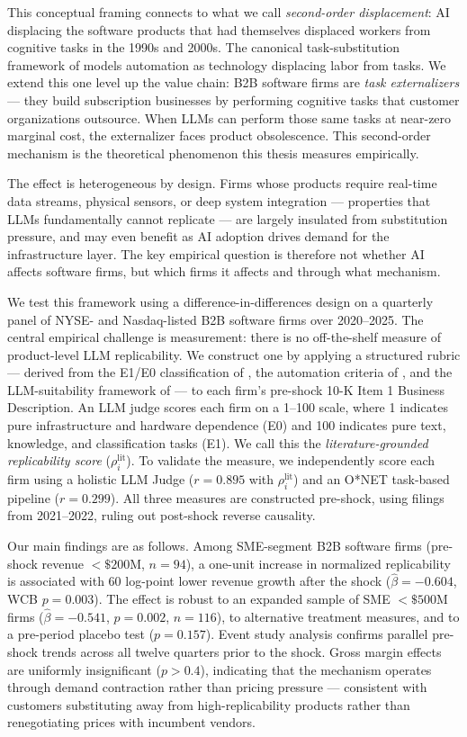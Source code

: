\documentclass[12pt,a4paper]{article}
\begin{document}
This conceptual framing connects to what we call \emph{second-order displacement}: AI displacing the software products that had themselves displaced workers from cognitive tasks in the 1990s and 2000s. The canonical task-substitution framework of \citet{acemoglu2022} models automation as technology displacing labor from tasks. We extend this one level up the value chain: B2B software firms are \emph{task externalizers} --- they build subscription businesses by performing cognitive tasks that customer organizations outsource. When LLMs can perform those same tasks at near-zero marginal cost, the externalizer faces product obsolescence. This second-order mechanism is the theoretical phenomenon this thesis measures empirically.

The effect is heterogeneous by design. Firms whose products require real-time data streams, physical sensors, or deep system integration --- properties that LLMs fundamentally cannot replicate --- are largely insulated from substitution pressure, and may even benefit as AI adoption drives demand for the infrastructure layer. The key empirical question is therefore not whether AI affects software firms, but which firms it affects and through what mechanism.

We test this framework using a difference-in-differences design on a quarterly panel of NYSE- and Nasdaq-listed B2B software firms over 2020--2025. The central empirical challenge is measurement: there is no off-the-shelf measure of product-level LLM replicability. We construct one by applying a structured rubric --- derived from the E1/E0 classification of \citet{eloundou2024}, the automation criteria of \citet{acemoglu2022}, and the LLM-suitability framework of \citet{brynjolfsson2023} --- to each firm's pre-shock 10-K Item 1 Business Description. An LLM judge scores each firm on a 1--100 scale, where 1 indicates pure infrastructure and hardware dependence (E0) and 100 indicates pure text, knowledge, and classification tasks (E1). We call this the \emph{literature-grounded replicability score} ($\rho_i^{\text{lit}}$). To validate the measure, we independently score each firm using a holistic LLM Judge ($r = 0.895$ with $\rho_i^{\text{lit}}$) and an O*NET task-based pipeline ($r = 0.299$). All three measures are constructed pre-shock, using filings from 2021--2022, ruling out post-shock reverse causality.

Our main findings are as follows. Among SME-segment B2B software firms (pre-shock revenue $<\$200$M, $n=94$), a one-unit increase in normalized replicability is associated with 60 log-point lower revenue growth after the shock ($\hat{\beta} = -0.604$, WCB $p = 0.003$). The effect is robust to an expanded sample of SME $<\$500$M firms ($\hat{\beta} = -0.541$, $p = 0.002$, $n=116$), to alternative treatment measures, and to a pre-period placebo test ($p = 0.157$). Event study analysis confirms parallel pre-shock trends across all twelve quarters prior to the shock. Gross margin effects are uniformly insignificant ($p > 0.4$), indicating that the mechanism operates through demand contraction rather than pricing pressure --- consistent with customers substituting away from high-replicability products rather than renegotiating prices with incumbent vendors.
\end{document}
